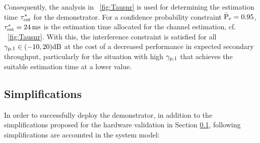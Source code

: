 Consequently, the analysis in \figurename~\ref{fig:Tausnr} is used for determining the estimation time ${\tau}^*_{\text{est}}$ for the demonstrator. For a confidence probability constraint $\bar{\text{P}}_{\text{c}} = 0.95$, ${\tau}^*_{\text{est}} = \SI{24}{ms}$ is the estimation time allocated for the channel estimation, cf. \figurename~\ref{fig:Tausnr}. With this, the interference constraint is satisfied for all ${\gamma}_{\text{p,1}} \in (-10,20)\SI{}{dB}$ at the cost of a decreased performance in expected secondary throughput, particularly for the situation with high ${\gamma}_{\text{p,1}}$ that achieves the suitable estimation time at a lower value.


\subsection{Simplifications} \label{ssec:simp2}
In order to successfully deploy the demonstrator, in addition to the simplifications proposed for the hardware validation in Section \ref{ssec:simp2}, following simplifications are accounted in the system model: 

